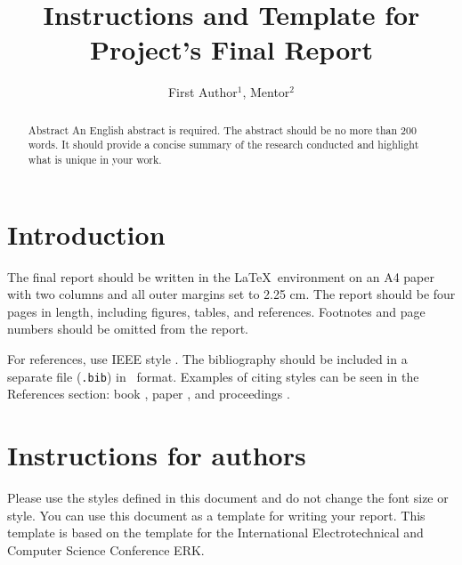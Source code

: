 \documentclass[a4paper]{article}
\begin{document}
\title{Instructions and Template for Project's Final Report}

\author{First Author$^{1}$, Mentor$^{2}$} %



\maketitle


\begin{abstract}{Abstract}
An English abstract is required. The abstract should be no more than 200 words. It should provide a concise summary of the research conducted and highlight what is unique in your work.
\end{abstract}

\section{Introduction}


The final report should be written in the \LaTeX\ environment on an A4 paper with two columns and all outer margins set to 2.25 cm. The report should be four pages in length, including figures, tables, and references. Footnotes and page numbers should be omitted from the report.

For references, use IEEE style \cite{ieee2023}. The bibliography should be included in a separate file (\verb".bib") in \BibTeX\ format. Examples of citing styles can be seen in the References section: book \cite{mihelj2019robotics}, paper \cite{abbott2007pseudo}, and proceedings \cite{beravs2011development}.

\section{Instructions for authors}

Please use the styles defined in this document and do not change the font size or style. You can use this document as a template for writing your report. This template is based on the template for the International Electrotechnical and Computer Science Conference ERK.
\end{document}
